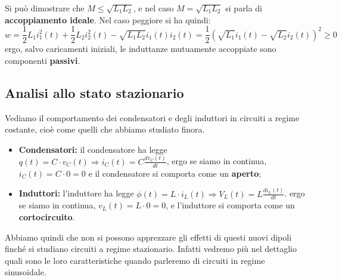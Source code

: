 \documentclass[a4paper,11pt]{article}
\begin{document}
Si può dimostrare che $ M \leq \sqrt{L_1 L_2}$, e nel caso $M = \sqrt{L_1 L_2}$ si parla di \textbf{accoppiamento ideale}. Nel caso peggiore si ha quindi:
$$
w = \frac{1}{2} L_1 i_1^2(t) + \frac{1}{2} L_2 i_2^2(t) - \sqrt{L_1 L_2} i_1(t) i_2(t) = \frac{1}{2}\left( \sqrt{L_1} i_1(t) - \sqrt{L_2} i_2(t) \right)^2 \geq 0
$$
ergo, salvo caricamenti iniziali, le induttanze mutuamente accoppiate sono componenti \textbf{passivi}.

\subsection{Analisi allo stato stazionario}
Vediamo il comportamento dei condensatori e degli induttori in circuiti a regime costante, cioè come quelli che abbiamo studiato finora.
\begin{itemize}
	\item \textbf{Condensatori:} il condensatore ha legge $q(t) = C \cdot v_C(t) \Rightarrow i_C(t) = C \frac{dv_C(t)}{dt}$, ergo se siamo in continua, $i_C(t) = C \cdot 0 = 0$ e il condensatore si comporta come un \textbf{aperto};
	\item \textbf{Induttori:} l'induttore ha legge $\phi(t) = L \cdot i_L(t) \Rightarrow V_L(t) = L \frac{di_L(t)}{dt}$. ergo se siamo in continua, $v_L (t) = L \cdot 0 = 0$, e l'induttore si comporta come un \textbf{cortocircuito}.
\end{itemize}
Abbiamo quindi che non si possono apprezzare gli effetti di questi nuovi dipoli finché si studiano circuiti a regime stazionario.
Infatti vedremo più nel dettaglio quali sono le loro caratteristiche quando parleremo di circuiti in regime sinusoidale.
\end{document}
